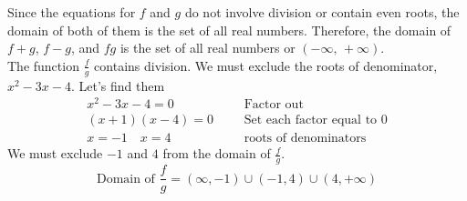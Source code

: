 Since the equations for $f$ and $g$ do not involve division or contain even roots, the domain of both of them is the set of all real numbers. Therefore, the domain of $f+g$, $f-g$, and $fg$ is the set of all real numbers or $(-\infty,\,+\infty)$.\\
The function $\frac{f}{g}$ contains division. We must exclude the roots of denominator, $x^2-3x-4$. Let's find them
\begin{align*}
    x^2-3x-4=0&     &       &\text{Factor out}\\
    (x+1)(x-4)=0&   &       &\text{Set each factor equal to 0}\\
    x=-1\quad x=4&  &       &\text{roots of denominators}
\end{align*}
We must exclude $-1$ and $4$ from the domain of $\frac{f}{g}$. 
\begin{equation*}
    \text{Domain of }\frac{f}{g} = (\infty,-1) \cup (-1,4) \cup (4,+\infty)
\end{equation*}
